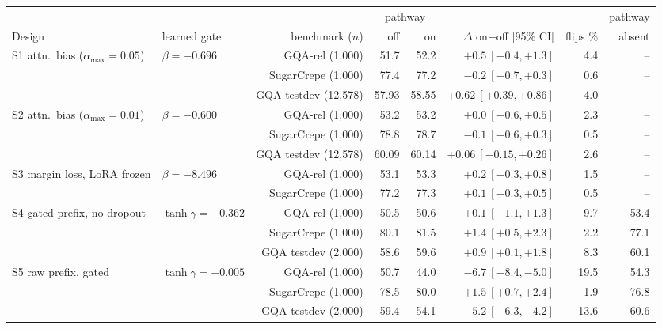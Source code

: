 \begin{tabular}{@{}llrrrrrr@{}}
\toprule
 & & & \multicolumn{2}{c}{pathway} & & & pathway \\
\cmidrule(lr){4-5}
Design & learned gate & benchmark ($n$) & off & on & $\Delta$ on$-$off [95\% CI] & flips \% & absent \\
\midrule
S1 attn.\ bias ($\alpha_{\max}{=}0.05$) & $\beta{=}-0.696$ & GQA-rel (1,000) & 51.7 & 52.2 & $+0.5\ [-0.4, +1.3]$ & 4.4 & -- \\
 &  & SugarCrepe (1,000) & 77.4 & 77.2 & $-0.2\ [-0.7, +0.3]$ & 0.6 & -- \\
 &  & GQA testdev (12,578) & 57.93 & 58.55 & $+0.62\ [+0.39, +0.86]$ & 4.0 & -- \\
\midrule
S2 attn.\ bias ($\alpha_{\max}{=}0.01$) & $\beta{=}-0.600$ & GQA-rel (1,000) & 53.2 & 53.2 & $+0.0\ [-0.6, +0.5]$ & 2.3 & -- \\
 &  & SugarCrepe (1,000) & 78.8 & 78.7 & $-0.1\ [-0.6, +0.3]$ & 0.5 & -- \\
 &  & GQA testdev (12,578) & 60.09 & 60.14 & $+0.06\ [-0.15, +0.26]$ & 2.6 & -- \\
\midrule
S3 margin loss, LoRA frozen & $\beta{=}-8.496$ & GQA-rel (1,000) & 53.1 & 53.3 & $+0.2\ [-0.3, +0.8]$ & 1.5 & -- \\
 &  & SugarCrepe (1,000) & 77.2 & 77.3 & $+0.1\ [-0.3, +0.5]$ & 0.5 & -- \\
\midrule
S4 gated prefix, no dropout & $\tanh\gamma{=}-0.362$ & GQA-rel (1,000) & 50.5 & 50.6 & $+0.1\ [-1.1, +1.3]$ & 9.7 & 53.4 \\
 &  & SugarCrepe (1,000) & 80.1 & 81.5 & $+1.4\ [+0.5, +2.3]$ & 2.2 & 77.1 \\
 &  & GQA testdev (2,000) & 58.6 & 59.6 & $+0.9\ [+0.1, +1.8]$ & 8.3 & 60.1 \\
\midrule
S5 raw prefix, gated & $\tanh\gamma{=}+0.005$ & GQA-rel (1,000) & 50.7 & 44.0 & $-6.7\ [-8.4, -5.0]$ & 19.5 & 54.3 \\
 &  & SugarCrepe (1,000) & 78.5 & 80.0 & $+1.5\ [+0.7, +2.4]$ & 1.9 & 76.8 \\
 &  & GQA testdev (2,000) & 59.4 & 54.1 & $-5.2\ [-6.3, -4.2]$ & 13.6 & 60.6 \\
\bottomrule
\end{tabular}
